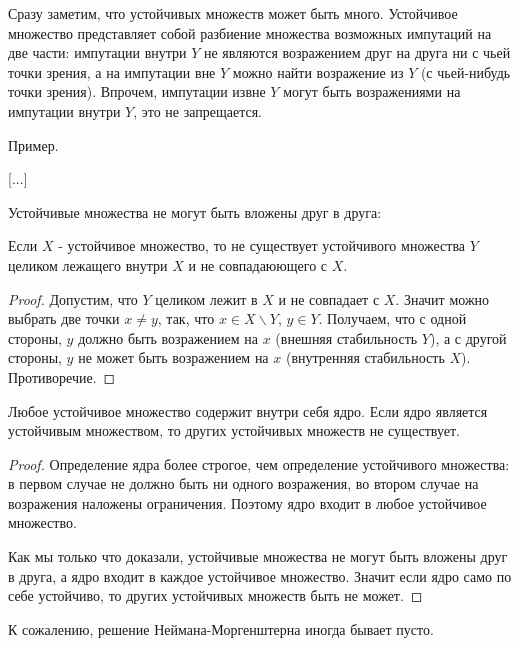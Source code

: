 Сразу заметим, что устойчивых множеств может быть много. Устойчивое множество представляет собой разбиение множества возможных импутаций на две части: импутации внутри $Y$ не являются возражением друг на друга ни с чьей точки зрения, а на импутации вне $Y$ можно найти возражение из $Y$ (с чьей-нибудь точки зрения). Впрочем, импутации извне $Y$ могут быть возражениями на импутации внутри $Y$, это не запрещается.

Пример.


[...]




Устойчивые множества не могут быть вложены друг в друга:
\begin{theorem}
Если $X$ - устойчивое множество, то не существует устойчивого множества $Y$ целиком лежащего внутри $X$ и не совпадаюющего с $X$.
\end{theorem}
\begin{proof}
Допустим, что $Y$ целиком лежит в $X$ и не совпадает с $X$. Значит можно выбрать две точки $x\neq y$, так, что $x\in X\backslash Y$, $y\in Y$. Получаем, что с одной стороны, $y$ должно быть возражением на $x$ (внешняя стабильность $Y$), а с другой стороны, $y$ не может быть возражением на $x$ (внутренняя стабильность $X$). Противоречие.
\end{proof}


\begin{theorem}
Любое устойчивое множество содержит внутри себя ядро. Если ядро является устойчивым множеством, то других устойчивых множеств не существует.
\end{theorem}
\begin{proof}
Определение ядра более строгое, чем определение устойчивого множества: в первом случае не должно быть ни одного возражения, во втором случае на возражения наложены ограничения. Поэтому ядро входит в любое устойчивое множество.

Как мы только что доказали, устойчивые множества не могут быть вложены друг в друга, а ядро входит в каждое устойчивое множество. Значит если ядро само по себе устойчиво, то других устойчивых множеств быть не может.
\end{proof}

К сожалению, решение Неймана-Моргенштерна иногда бывает пусто.






